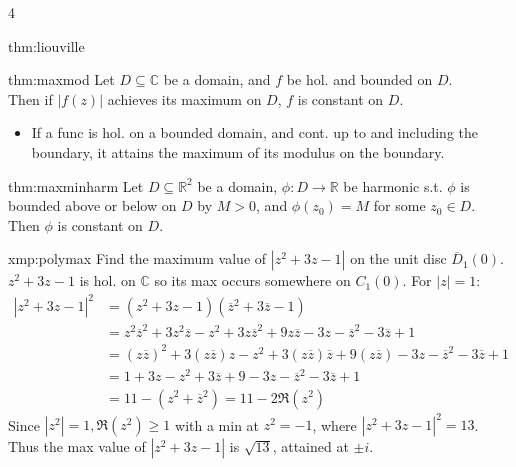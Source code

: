 \documentclass[landscape, 8pt]{extarticle}
\begin{document}
\begin{multicols*}{4}
\begin{thm}{thm:liouville}{ }
	\end{thm}
	
	
	\begin{thm}{thm:maxmod}{ }
		Let $D \subseteq \mathbb{C}$ be a domain, and $f$ be hol. and bounded on $D$.\\
		Then if $\left|f(z)\right|$ achieves its maximum on $D$, $f$ is constant on $D$.
		\begin{itemize}
			\item If a func is hol. on a bounded domain, and cont. up to and including the boundary, it attains the maximum of its modulus on the boundary.
			
		\end{itemize}
		
	\end{thm}
	
	
	\begin{thm-s}{thm:maxminharm}{ }
		Let $D \subseteq \mathbb{R}^2$  be a domain, $\phi : D \to \mathbb{R}$ be harmonic s.t. $\phi$ is bounded above or below on $D$ by $M > 0$, and $\phi(z_0) = M$ for some $z_0 \in D$. \\
		Then $\phi$ is constant on $D$.
		
	\end{thm-s}
	
	
	\begin{xmp}{xmp:polymax}{ }
		Find the maximum value of $\left|z^2 + 3z - 1\right|$ on the unit disc $\overline{D}_1(0)$.\\
		$z^2 + 3z - 1$ is hol. on $\mathbb{C}$ so its max occurs somewhere on $C_1(0)$. For $\left|z\right| = 1$:
		\begin{align*}
			\left|z^2 + 3z - 1\right|^2 &= \left(z^2 + 3z - 1\right)\left(\overline{z}^2 + 3\overline{z} - 1\right)\\
			&= z^2 \overline{z}^2 + 3z^2 \overline{z} - z^2 + 3z \overline{z}^2 + 9 z \overline{z} - 3z - \overline{z}^2 - 3\overline{z} +1\\
			&= (z \overline{z})^2 + 3(z \overline{z})z - z^2 + 3(z \overline{z})\overline{z} + 9(z \overline{z}) - 3z - \overline{z}^2 - 3\overline{z} + 1\\
			& = 1 + 3z - z^2 + 3 \overline{z} + 9 - 3z - \overline{z}^2 - 3 \overline{z} + 1\\
			&= 11 - (z^2 + \overline{z}^2) = 11 - 2\Re(z^2)
		\end{align*}
		Since $\left|z^2\right| = 1, \Re(z^2) \ge 1$ with a min at $z^2 = -1$, where $\left|z^2 + 3z - 1\right|^2 = 13$. Thus the max value of $\left|z^2 + 3z - 1\right|$ is $\sqrt{13}$, attained at $\pm i$.
		

\end{xmp}
\end{multicols*}
\end{document}
